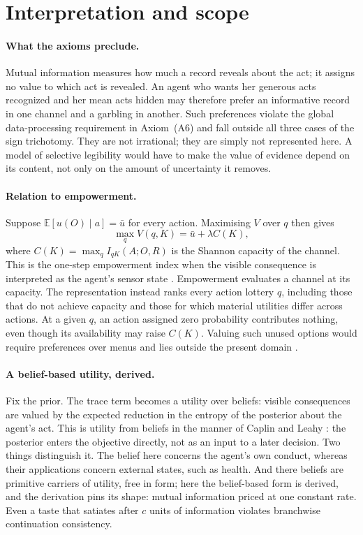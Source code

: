 \documentclass[11pt,a4paper]{article}
\theoremstyle{definition}
\newcommand{\E}{\mathbb E}
\newcommand{\1}{\mathbf 1}
\begin{document}
\section{Interpretation and scope}\label{sec:interpretation}

\paragraph{What the axioms preclude.}Mutual information measures how much a record reveals about the act; it assigns no value to which act is revealed. An agent who wants her generous acts recognized and her mean acts hidden may therefore prefer an informative record in one channel and a garbling in another. Such preferences violate the global data-processing requirement in Axiom~\textup{(A6)} and fall outside all three cases of the sign trichotomy. They are not irrational; they are simply not represented here. A model of selective legibility would have to make the value of evidence depend on its content, not only on the amount of uncertainty it removes.


\paragraph{Relation to empowerment.}
Suppose $\E[u(O)\mid a]=\bar u$ for every action.  Maximising $V$ over $q$ then gives
\[
 \max_q V(q,K)=\bar u+\lambda C(K),
\]
where $C(K)=\max_q I_{qK}(A;O,R)$ is the Shannon capacity of the channel.  This is the one-step
empowerment index when the visible consequence is interpreted as the agent's sensor state
\cite{KlyubinPolaniNehaniv2005,SalgeGlackinPolani2014}.  Empowerment evaluates a channel at its
capacity.  The representation instead ranks every action lottery $q$, including those that do not
achieve capacity and those for which material utilities differ across actions.  At a given $q$, an
action assigned zero probability contributes nothing, even though its availability may raise
$C(K)$.  Valuing such unused options would require preferences over menus and lies outside the
present domain \cite{Kreps1979}.

\paragraph{A belief-based utility, derived.}
Fix the prior.  The trace term becomes a utility over beliefs: visible consequences are valued by the expected
reduction in the entropy of the posterior about the agent's act.  This is utility from beliefs in the manner of
Caplin and Leahy \cite{CaplinLeahy2001}: the posterior enters the objective directly, not as an input to a later
decision.  Two things distinguish it.  The belief here concerns the agent's own conduct, whereas their
applications concern external states, such as health.  And there beliefs are primitive carriers of utility, free
in form; here the belief-based form is derived, and the derivation pins its shape: mutual information priced at
one constant rate.  Even a taste that satiates after $c$ units of information violates branchwise continuation
consistency.
\end{document}
